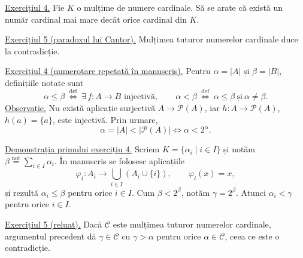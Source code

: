 \medskip
\noindent\underline{Exercițiul 4.}
Fie $K$ o mulțime de numere cardinale. Să se arate că există un
număr cardinal mai mare decât orice cardinal din $K$.

\smallskip
\noindent\underline{Exercițiul 5 (paradoxul lui Cantor).}
Mulțimea tuturor numerelor cardinale duce la contradicție.

\smallskip
\noindent\underline{Exercițiul 4 (numerotare repetată în manuscris).}
Pentru $\alpha=|A|$ și $\beta=|B|$, definițiile notate sunt
\[
 \alpha\leq\beta\ \overset{\mathrm{def}}{\iff}\
 \exists\,f:A\longrightarrow B\text{ injectivă},
 \qquad
 \alpha<\beta\ \overset{\mathrm{def}}{\iff}\
 \alpha\leq\beta\ \text{și}\ \alpha\neq\beta.
\]
\noindent\underline{Observație.}
Nu există aplicație surjectivă $A\longrightarrow\mathcal P(A)$,
iar $h:A\longrightarrow\mathcal P(A)$, $h(a)=\{a\}$, este injectivă.
Prin urmare,
\[
 \alpha=|A|<|\mathcal P(A)|\iff\alpha<2^{\alpha}.
\]

\noindent\underline{Demonstrația primului exercițiu 4.}
Scriem $K=\{\alpha_i\mid i\in I\}$ și notăm
$\beta\overset{\mathrm{not}}{=}\sum_{i\in I}\alpha_i$.
În manuscris se folosesc aplicațiile
\[
 \varphi_i:A_i\longrightarrow\bigcup_{i\in I}(A_i\cup\{i\}),
 \qquad\varphi_i(x)=x,
\]
și rezultă $\alpha_i\leq\beta$ pentru orice $i\in I$.
Cum $\beta<2^{\beta}$, notăm $\gamma=2^{\beta}$. Atunci
$\alpha_i<\gamma$ pentru orice $i\in I$.

\noindent\underline{Exercițiul 5 (reluat).}
Dacă $\mathcal C$ este mulțimea tuturor numerelor cardinale,
argumentul precedent dă $\gamma\in\mathcal C$ cu
$\gamma>\alpha$ pentru orice $\alpha\in\mathcal C$,
ceea ce este o contradicție.
\endgroup
